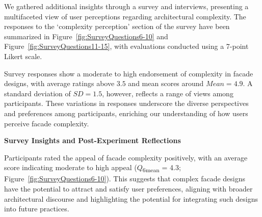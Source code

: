 %    


We gathered additional insights through a survey and interviews, presenting a multifaceted view of user perceptions regarding architectural complexity.
The responses to the `complexity perception' section of the survey have been summarized in Figure~\ref{fig:SurveyQuestions6-10} and Figure~\ref{fig:SurveyQuestions11-15}, with evaluations conducted using a 7-point Likert scale.

Survey responses show a moderate to high endorsement of complexity in facade designs, with average ratings above \(3.5\) and mean scores around \(Mean = 4.9\).
A standard deviation of \(SD = 1.5\), however, reflects a range of views among participants.
These variations in responses underscore the diverse perspectives and preferences among participants, enriching our understanding of how users perceive facade complexity.

\textbf{Survey Insights and Post-Experiment Reflections}


Participants rated the appeal of facade complexity positively, with an average score indicating moderate to high appeal (\(Q\)\textsubscript{\small{6mean}} = 4.3; Figure~\ref{fig:SurveyQuestions6-10}).
This suggests that complex facade designs have the potential to attract and satisfy user preferences, aligning with broader architectural discourse and highlighting the potential for integrating such designs into future practices.

